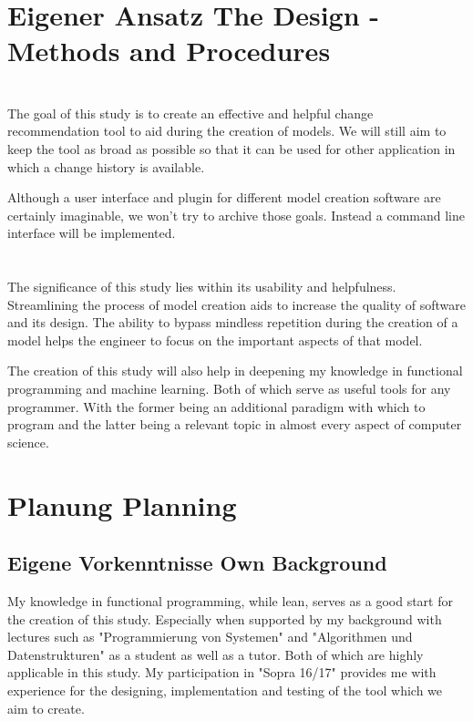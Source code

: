 \documentclass[10pt,a4paper,oneside]{scrartcl}
\begin{document}
\section{
	{Eigener Ansatz}
	{The Design - Methods and Procedures}}
\label{sec:approach}

{}


\section{}
The goal of this study is to create an effective and helpful change recommendation tool to aid during the creation of models. We will still aim to keep the tool as broad as possible so that it can be used for other application in which a change history is available.

Although a user interface and plugin for different model creation software are certainly imaginable, we won't try to archive those goals. Instead a command line interface will be implemented.


\section{}
The significance of this study lies within its usability and helpfulness. Streamlining the process of model creation aids to increase the quality of software and its design. The ability to bypass mindless repetition during the creation of a model helps the engineer to focus on the important aspects of that model. 

The creation of this study will also help in deepening my knowledge in functional programming and machine learning. Both of which serve as useful tools for any programmer. With the former being an additional paradigm with which to program and the latter being a relevant topic in almost every aspect of computer science.


\section{
	{Planung}
	{Planning}}
\label{sec:planning}

\subsection{
	{Eigene Vorkenntnisse}
	{Own Background}}
\label{sub:background}
My knowledge in functional programming, while lean, serves as a good start for the creation of this study. Especially when supported by my background with lectures such as "Programmierung von Systemen" and "Algorithmen und Datenstrukturen" as a student as well as a tutor. Both of which are highly applicable in this study. My participation in "Sopra 16/17" provides me with experience for the designing, implementation and testing of the tool which we aim to create. 
\end{document}
